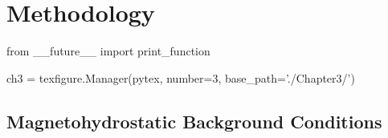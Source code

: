 \chapter{Methodology}\label{ch:methodology}  %

\begin{pycode}[chapter3]
from __future__ import print_function

ch3 = texfigure.Manager(pytex, number=3, base_path='./Chapter3/')
\end{pycode}

%

%
%
%		
%	

\section{Magnetohydrostatic Background Conditions}\label{sec:mhsbackground}

